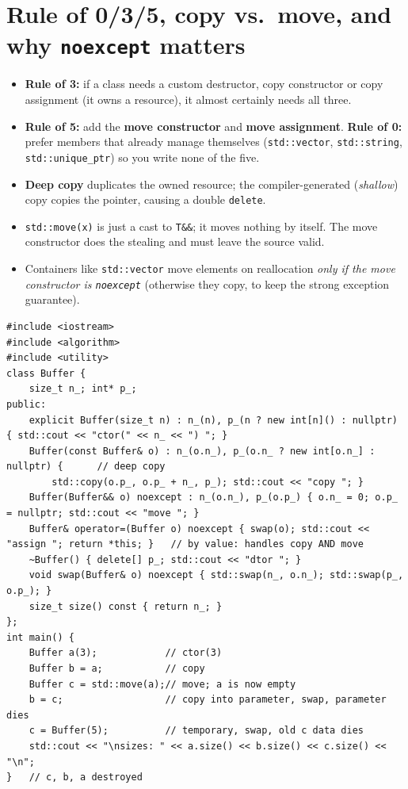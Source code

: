 \documentclass[10pt,a4paper,openany,oneside]{report}
\newcommand{\prio}[1]{\texorpdfstring{\ifcase#1\or{\color{gold}\ding{72}}\or{\color{gold}\ding{72}\ding{72}}\or{\color{gold}\ding{72}\ding{72}\ding{72}}\fi}{}}
\begin{document}
\section{Rule of 0/3/5, copy vs.\ move, and why \texttt{noexcept} matters \prio{3}}
\begin{mustbox}
\begin{itemize}[nosep]
\item \textbf{Rule of 3:} if a class needs a custom destructor, copy constructor or copy assignment (it owns a resource), it almost certainly needs all three.
\item \textbf{Rule of 5:} add the \textbf{move constructor} and \textbf{move assignment}. \textbf{Rule of 0:} prefer members that already manage themselves (\texttt{std::vector}, \texttt{std::string}, \texttt{std::unique\_ptr}) so you write none of the five.
\item \textbf{Deep copy} duplicates the owned resource; the compiler-generated (\emph{shallow}) copy copies the pointer, causing a double \texttt{delete}.
\item \texttt{std::move(x)} is just a cast to \texttt{T\&\&}; it moves nothing by itself. The move constructor does the stealing and must leave the source valid.
\item Containers like \texttt{std::vector} move elements on reallocation \emph{only if the move constructor is \texttt{noexcept}} (otherwise they copy, to keep the strong exception guarantee).
\end{itemize}
\end{mustbox}
\begin{lstlisting}[language={[11]C++},title={A resource-owning class with copy-and-swap assignment}]
#include <iostream>
#include <algorithm>
#include <utility>
class Buffer {
    size_t n_; int* p_;
public:
    explicit Buffer(size_t n) : n_(n), p_(n ? new int[n]() : nullptr) { std::cout << "ctor(" << n_ << ") "; }
    Buffer(const Buffer& o) : n_(o.n_), p_(o.n_ ? new int[o.n_] : nullptr) {      // deep copy
        std::copy(o.p_, o.p_ + n_, p_); std::cout << "copy "; }
    Buffer(Buffer&& o) noexcept : n_(o.n_), p_(o.p_) { o.n_ = 0; o.p_ = nullptr; std::cout << "move "; }
    Buffer& operator=(Buffer o) noexcept { swap(o); std::cout << "assign "; return *this; }   // by value: handles copy AND move
    ~Buffer() { delete[] p_; std::cout << "dtor "; }
    void swap(Buffer& o) noexcept { std::swap(n_, o.n_); std::swap(p_, o.p_); }
    size_t size() const { return n_; }
};
int main() {
    Buffer a(3);            // ctor(3)
    Buffer b = a;           // copy
    Buffer c = std::move(a);// move; a is now empty
    b = c;                  // copy into parameter, swap, parameter dies
    c = Buffer(5);          // temporary, swap, old c data dies
    std::cout << "\nsizes: " << a.size() << b.size() << c.size() << "\n";
}   // c, b, a destroyed
\end{lstlisting}
\end{document}
